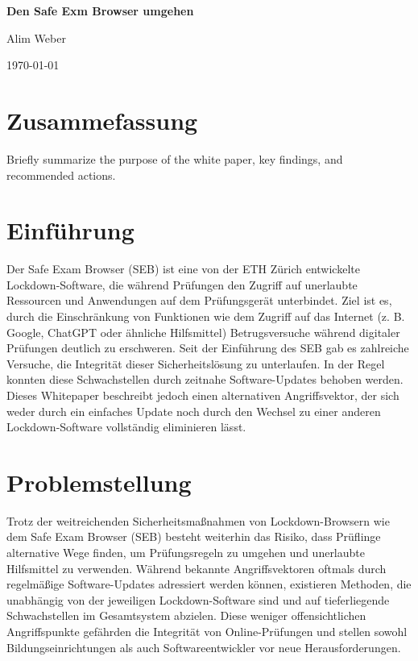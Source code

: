 \documentclass[14pt]{article}
\begin{document}
\begin{titlepage}
    \centering
    \vspace*{5cm}
    {\huge\bfseries Den Safe Exm Browser umgehen\par}
    \vspace{1.5cm}
    \vspace{2cm}
    {\large Alim Weber\par}
    \vfill
    {\large \today\par}
\end{titlepage}

\newpage
\section*{Zusammefassung}
Briefly summarize the purpose of the white paper, key findings, and recommended actions.

\newpage
\tableofcontents

\newpage
\section{Einführung}
Der Safe Exam Browser (SEB) ist eine von der ETH Zürich entwickelte Lockdown-Software, die während Prüfungen den Zugriff auf unerlaubte Ressourcen und Anwendungen auf dem Prüfungsgerät unterbindet. Ziel ist es, durch die Einschränkung von Funktionen wie dem Zugriff auf das Internet (z. B. Google, ChatGPT oder ähnliche Hilfsmittel) Betrugsversuche während digitaler Prüfungen deutlich zu erschweren. Seit der Einführung des SEB gab es zahlreiche Versuche, die Integrität dieser Sicherheitslösung zu unterlaufen. In der Regel konnten diese Schwachstellen durch zeitnahe Software-Updates behoben werden. Dieses Whitepaper beschreibt jedoch einen alternativen Angriffsvektor, der sich weder durch ein einfaches Update noch durch den Wechsel zu einer anderen Lockdown-Software vollständig eliminieren lässt.

\section{Problemstellung}
Trotz der weitreichenden Sicherheitsmaßnahmen von Lockdown-Browsern wie dem Safe Exam Browser (SEB) besteht weiterhin das Risiko, dass Prüflinge alternative Wege finden, um Prüfungsregeln zu umgehen und unerlaubte Hilfsmittel zu verwenden. Während bekannte Angriffsvektoren oftmals durch regelmäßige Software-Updates adressiert werden können, existieren Methoden, die unabhängig von der jeweiligen Lockdown-Software sind und auf tieferliegende Schwachstellen im Gesamtsystem abzielen. Diese weniger offensichtlichen Angriffspunkte gefährden die Integrität von Online-Prüfungen und stellen sowohl Bildungseinrichtungen als auch Softwareentwickler vor neue Herausforderungen.
\end{document}
